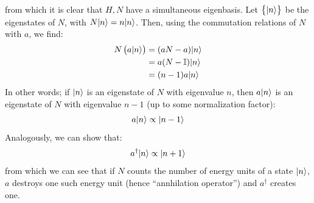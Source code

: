 from which it is clear that $H, N$ have a simultaneous eigenbasis. Let $\set{\lvert n \rangle}$ be the eigenstates of $N$, with $N\lvert n \rangle = n\lvert n \rangle$. Then, using the commutation relations of $N$ with $a$, we find:
\begin{equation}
    \begin{split}
        N\left(a\lvert n \rangle\right) &= (aN - a)\lvert n \rangle
        \\ &= a(N - \mathbb{I})\lvert n \rangle
        \\ &= (n - 1)a\lvert n \rangle
    \end{split}
\end{equation}
In other words; if $\lvert n \rangle$ is an eigenstate of $N$ with eigenvalue $n$, then $a\lvert n \rangle$ is an eigenstate of $N$ with eigenvalue $n-1$ (up to some normalization factor):
\begin{equation}
    a\lvert n \rangle \propto \lvert n-1 \rangle
\end{equation}
Analogously, we can show that:
\begin{equation}
    a^\dag\lvert n \rangle \propto \lvert n+1 \rangle
\end{equation}
from which we can see that if $N$ counts the number of energy units of a state $\lvert n \rangle$, $a$ destroys one such energy unit (hence ``annhilation operator'') and $a^\dag$ creates one.

